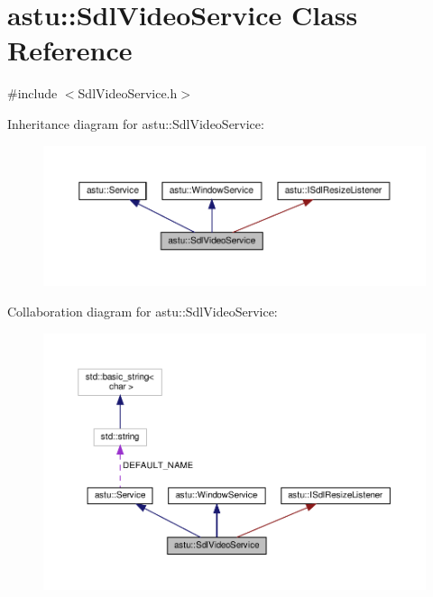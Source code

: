 \hypertarget{classastu_1_1SdlVideoService}{}\section{astu\+:\+:Sdl\+Video\+Service Class Reference}
\label{classastu_1_1SdlVideoService}


{\ttfamily \#include $<$Sdl\+Video\+Service.\+h$>$}



Inheritance diagram for astu\+:\+:Sdl\+Video\+Service\+:\nopagebreak
\begin{figure}[H]
\begin{center}
\leavevmode
\includegraphics[width=350pt]{classastu_1_1SdlVideoService__inherit__graph}
\end{center}
\end{figure}


Collaboration diagram for astu\+:\+:Sdl\+Video\+Service\+:\nopagebreak
\begin{figure}[H]
\begin{center}
\leavevmode
\includegraphics[width=350pt]{classastu_1_1SdlVideoService__coll__graph}
\end{center}
\end{figure}
